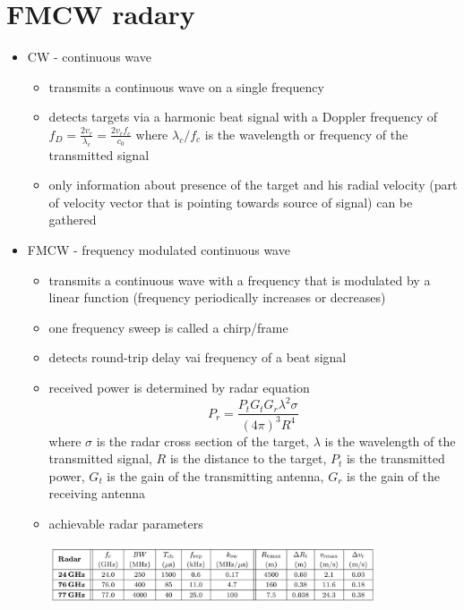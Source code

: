 \documentclass[a4paper,12pt]{report}
\begin{document}
\titlep
\tocp

\pagestyle{plain}

\chapter{FMCW radary}

\begin{itemize}
	\item CW - continuous wave
		\begin{itemize}
			\item transmits a continuous wave on a single frequency
			\item detects targets via a harmonic beat signal with a Doppler frequency of $f_D = \frac{2v_r}{\lambda_c} = \frac{2v_r f_c}{c_0}$ where $\lambda_c/f_c$ is the wavelength or frequency of the transmitted signal
			\item only information about presence of the target and his radial velocity (part of velocity vector that is pointing towards source of signal) can be gathered
		\end{itemize}
	\item FMCW - frequency modulated continuous wave
		\begin{itemize}
			\item transmits a continuous wave with a frequency that is modulated by a linear function (frequency periodically increases or decreases)
			\item one frequency sweep is called a chirp/frame
			\item detects round-trip delay vai frequency of a beat signal
			\item received power is determined by radar equation
				\[
					P_r = \frac{P_t G_t G_r \lambda^2 \sigma}{(4\pi)^3 R^4}
				\]
				where $\sigma$ is the radar cross section of the target, $\lambda$ is the wavelength of the transmitted signal, $R$ is the distance to the target, $P_t$ is the transmitted power, $G_t$ is the gain of the transmitting antenna, $G_r$ is the gain of the receiving antenna
			\item achievable radar parameters
				\begin{center}
					\includegraphics[width=0.8\textwidth]{./img/fmcw_radar_paramters.jpg}
				\end{center}

\end{itemize}
\end{itemize}
\end{document}
